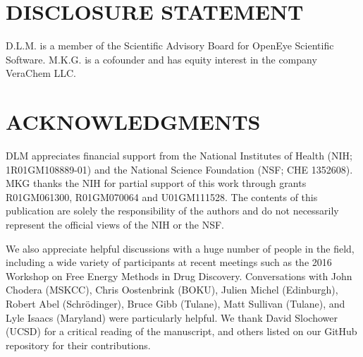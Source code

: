 \documentclass[aps,pre,twocolumn,nofootinbib,superscriptaddress,10pt, final,tightenlines]{revtex4-1}
\begin{document}
\section*{DISCLOSURE STATEMENT}
D.L.M. is a member of the Scientific Advisory Board for OpenEye Scientific Software. M.K.G. is a cofounder and has equity interest in the company VeraChem LLC.

\section*{ACKNOWLEDGMENTS}
DLM appreciates financial support from the National Institutes of Health (NIH; 1R01GM108889-01) and the National Science Foundation  (NSF; CHE 1352608). MKG thanks the NIH for partial support of this work through grants R01GM061300, R01GM070064 and U01GM111528. The contents of this publication are solely the responsibility of the authors and do not necessarily represent the official views of the NIH or the NSF. 

We also appreciate helpful discussions with a huge number of people in the field, including a wide variety of participants at recent meetings such as the 2016 Workshop on Free Energy Methods in Drug Discovery.
Conversations with John Chodera (MSKCC), Chris Oostenbrink (BOKU), Julien Michel (Edinburgh), Robert Abel (Schr\"{o}dinger), Bruce Gibb (Tulane), Matt Sullivan (Tulane), and Lyle Isaacs (Maryland) were particularly helpful.
We thank David Slochower (UCSD) for a critical reading of the manuscript, and others listed on our GitHub repository for their contributions.




\end{document}
